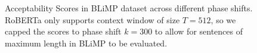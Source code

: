 \begin{figure}
    \centering
    \caption{Acceptability Scores in BLiMP \cite{warstadt-etal-2020-BLiMP-benchmark} dataset across different phase shifts. RoBERTa only supports context window of size $T=512$, so we capped the scores to phase shift $k=300$ to allow for sentences of maximum length in BLiMP to be evaluated.}
    \label{fig:acceptability}
\end{figure}